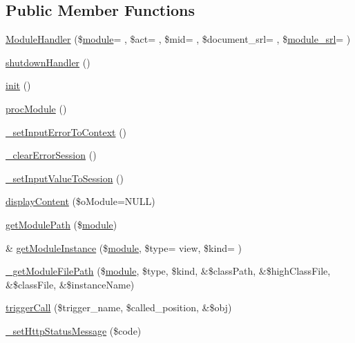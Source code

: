 \subsection*{Public Member Functions}
\begin{DoxyCompactItemize}
\item 
\hyperlink{classModuleHandler_abfb13533d16d60323823189ccca73237}{Module\+Handler} (\$\hyperlink{classmodule}{module}= \textquotesingle{}\textquotesingle{}, \$act= \textquotesingle{}\textquotesingle{}, \$mid= \textquotesingle{}\textquotesingle{}, \$document\+\_\+srl= \textquotesingle{}\textquotesingle{}, \$\hyperlink{ko_8install_8php_a370bb6450fab1da3e0ed9f484a38b761}{module\+\_\+srl}= \textquotesingle{}\textquotesingle{})
\item 
\hyperlink{classModuleHandler_a6295c502e315baa6c563f48ddf08e233}{shutdown\+Handler} ()
\item 
\hyperlink{classModuleHandler_a4a4671c196a893207c38af84c8ee7da8}{init} ()
\item 
\hyperlink{classModuleHandler_a74ad0ae3090eff1da5a6e0e68ce431d0}{proc\+Module} ()
\item 
\hyperlink{classModuleHandler_aa47d0ccb069d65698ade6f44bf6c705f}{\+\_\+set\+Input\+Error\+To\+Context} ()
\item 
\hyperlink{classModuleHandler_a45c91a72acccf3ee8139538ef5aa1c1d}{\+\_\+clear\+Error\+Session} ()
\item 
\hyperlink{classModuleHandler_ab3837506079a320e2726079777bb2b3e}{\+\_\+set\+Input\+Value\+To\+Session} ()
\item 
\hyperlink{classModuleHandler_a140c43faf30dedf139212294e3e9acf3}{display\+Content} (\$o\+Module=N\+U\+LL)
\item 
\hyperlink{classModuleHandler_a0a175bdc5034df0bf4ce66ea0e6e1bf2}{get\+Module\+Path} (\$\hyperlink{classmodule}{module})
\item 
\& \hyperlink{classModuleHandler_aea2e4d82f816ee25ec97ce2c830e6860}{get\+Module\+Instance} (\$\hyperlink{classmodule}{module}, \$type= \textquotesingle{}view\textquotesingle{}, \$kind= \textquotesingle{}\textquotesingle{})
\item 
\hyperlink{classModuleHandler_a75e1eb90149d7f6e38cfd5dc7a9521d4}{\+\_\+get\+Module\+File\+Path} (\$\hyperlink{classmodule}{module}, \$type, \$kind, \&\$class\+Path, \&\$high\+Class\+File, \&\$class\+File, \&\$instance\+Name)
\item 
\hyperlink{classModuleHandler_aa1b1f9eae91ccd76e6a81c9375c2e673}{trigger\+Call} (\$trigger\+\_\+name, \$called\+\_\+position, \&\$obj)
\item 
\hyperlink{classModuleHandler_a91c14051caea99153975f2335a2dc770}{\+\_\+set\+Http\+Status\+Message} (\$code)
\end{DoxyCompactItemize}
